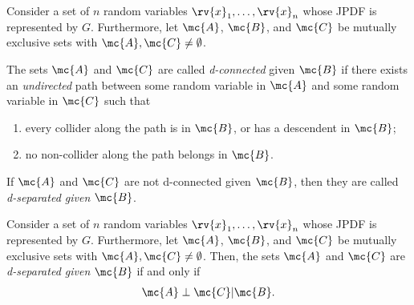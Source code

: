 \begin{definitionBox}
    Consider a set of $n$ random variables $\rv{x}_{1}, \ldots, \rv{x}_{n}$ whose JPDF is represented by $G$. 
    Furthermore, let $\mc{A}$, $\mc{B}$, and $\mc{C}$ be mutually exclusive sets with $\mc{A},\mc{C}\neq\emptyset$.

    The sets $\mc{A}$ and $\mc{C}$ are called \emph{d-connected} given $\mc{B}$ if there exists an \emph{undirected} path between some random variable in $\mc{A}$ and some random variable in $\mc{C}$ such that 
    \begin{enumerate}
        \item every collider along the path is in $\mc{B}$, or has a descendent in $\mc{B}$;
        \item no non-collider along the path belongs in $\mc{B}$.
    \end{enumerate}
    If $\mc{A}$ and $\mc{C}$ are not d-connected given $\mc{B}$, then they are called \emph{d-separated given $\mc{B}$}.
\end{definitionBox}

\begin{mytheorem}
   Consider a set of $n$ random variables $\rv{x}_{1}, \ldots, \rv{x}_{n}$ whose JPDF is represented by $G$. Furthermore, let $\mc{A}$, $\mc{B}$, and $\mc{C}$ be mutually exclusive sets with $\mc{A},\mc{C}\neq\emptyset$. Then, 
     the sets $\mc{A}$ and $\mc{C}$ are \emph{d-separated given} $\mc{B}$ if and only if 
     \begin{align}
         \mc{A} \perp \mc{C} | \mc{B}.
     \end{align}
\end{mytheorem}